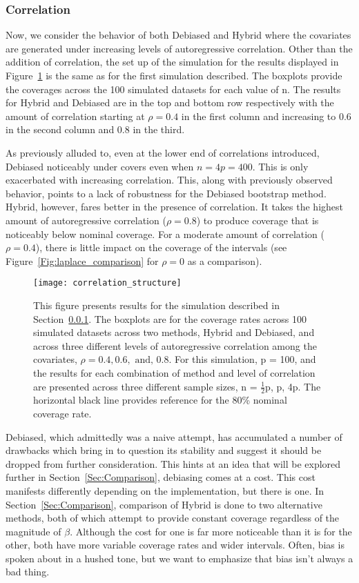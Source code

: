 \subsubsection{Correlation}\label{Sec:Correlation}

Now, we consider the behavior of both Debiased and Hybrid where the covariates are generated under increasing levels of autoregressive correlation. Other than the addition of correlation, the set up of the simulation for the results displayed in Figure~\ref{Fig:correlation_structure} is the same as for the first simulation described. The boxplots provide the coverages across the 100 simulated datasets for each value of n. The results for Hybrid and Debiased are in the top and bottom row respectively with the amount of correlation starting at $\rho = 0.4$ in the first column and increasing to $0.6$ in the second column and $0.8$ in the third. 

As previously alluded to, even at the lower end of correlations introduced, Debiased noticeably under covers even when $n = 4p = 400$. This is only exacerbated with increasing correlation. This, along with previously observed behavior, points to a lack of robustness for the Debiased bootstrap method. Hybrid, however, fares better in the presence of correlation. It takes the highest amount of autoregressive correlation ($\rho = 0.8$) to produce coverage that is noticeably below nominal coverage. For a moderate amount of correlation ($\rho = 0.4$), there is little impact on the coverage of the intervals (see Figure~\ref{Fig:laplace_comparison} for $\rho = 0$ as a comparison). 

\begin{figure}[hbtp]
  \texttt{[image: correlation\_structure]}
  \caption{\label{Fig:correlation_structure} This figure presents results for the simulation described in Section~\ref{Sec:Correlation}. The boxplots are for the coverage rates across 100 simulated datasets across two methods, Hybrid and Debiased, and across three different levels of autoregressive correlation among the covariates, $\rho = 0.4, 0.6, \text{ and, } 0.8$. For this simulation, p = 100, and the results for each combination of method and level of correlation are presented across three different sample sizes, n = $\frac{1}{2}$p, p, 4p. The horizontal black line provides reference for the 80\% nominal coverage rate.}
\end{figure}

Debiased, which admittedly was a naive attempt, has accumulated a number of drawbacks which bring in to question its stability and suggest it should be dropped from further consideration. This hints at an idea that will be explored further in Section~\ref{Sec:Comparison}, debiasing comes at a cost. This cost manifests differently depending on the implementation, but there is one. In Section~\ref{Sec:Comparison}, comparison of Hybrid is done to two alternative methods, both of which attempt to provide constant coverage regardless of the magnitude of $\beta$. Although the cost for one is far more noticeable than it is for the other, both have more variable coverage rates and wider intervals. Often, bias is spoken about in a hushed tone, but we want to emphasize that bias isn't always a bad thing. 


